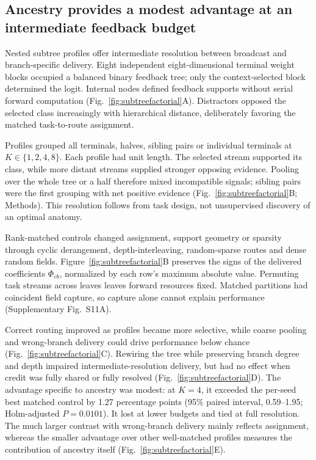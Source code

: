 \documentclass[11pt]{article}
\begin{document}
\subsection*{Ancestry provides a modest advantage at an intermediate feedback budget}

Nested subtree profiles offer intermediate resolution between broadcast and branch-specific delivery. Eight independent eight-dimensional terminal weight blocks occupied a balanced binary feedback tree; only the context-selected block determined the logit. Internal nodes defined feedback supports without serial forward computation (Fig.~\ref{fig:subtreefactorial}A). Distractors opposed the selected class increasingly with hierarchical distance, deliberately favoring the matched task-to-route assignment.

Profiles grouped all terminals, halves, sibling pairs or individual terminals at $K\in\{1,2,4,8\}$. Each profile had unit length. The selected stream supported its class, while more distant streams supplied stronger opposing evidence. Pooling over the whole tree or a half therefore mixed incompatible signals; sibling pairs were the first grouping with net positive evidence (Fig.~\ref{fig:subtreefactorial}B; Methods). This resolution follows from task design, not unsupervised discovery of an optimal anatomy.

Rank-matched controls changed assignment, support geometry or sparsity through cyclic derangement, depth-interleaving, random-sparse routes and dense random fields. Figure~\ref{fig:subtreefactorial}B preserves the signs of the delivered coefficients $\Phi_{cb}$, normalized by each row's maximum absolute value. Permuting task streams across leaves leaves forward resources fixed. Matched partitions had coincident field capture, so capture alone cannot explain performance (Supplementary Fig.~S11A).

Correct routing improved as profiles became more selective, while coarse pooling and wrong-branch delivery could drive performance below chance (Fig.~\ref{fig:subtreefactorial}C). Rewiring the tree while preserving branch degree and depth impaired intermediate-resolution delivery, but had no effect when credit was fully shared or fully resolved (Fig.~\ref{fig:subtreefactorial}D). The advantage specific to ancestry was modest: at $K=4$, it exceeded the per-seed best matched control by 1.27 percentage points (95\% paired interval, 0.59--1.95; Holm-adjusted $P=0.0101$). It lost at lower budgets and tied at full resolution. The much larger contrast with wrong-branch delivery mainly reflects assignment, whereas the smaller advantage over other well-matched profiles measures the contribution of ancestry itself (Fig.~\ref{fig:subtreefactorial}E).
\end{document}
